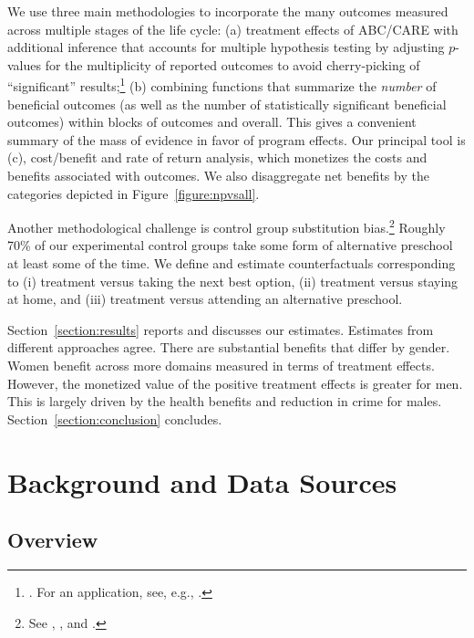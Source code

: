 We use three main methodologies to incorporate the many outcomes measured across multiple stages of the life cycle: (a) treatment effects of ABC/CARE with additional inference that accounts for multiple hypothesis testing by adjusting $p$-values for the multiplicity of reported outcomes to avoid cherry-picking of ``significant'' results;\footnote{\cite{Romano_Wolf_2005_JASA}. For an application, see, e.g., \cite{Heckman_Moon_etal_2010_QE}.} (b) combining functions that summarize the \emph{number} of beneficial outcomes (as well as the number of statistically significant beneficial outcomes) within blocks of outcomes and overall. This gives a convenient summary of the mass of evidence in favor of program effects. Our principal tool is (c), cost/benefit and rate of return analysis, which monetizes the costs and benefits associated with outcomes. We also disaggregate net benefits by the categories depicted in Figure~\ref{figure:npvsall}.

Another methodological challenge is control group substitution bias.\footnote{See \cite{Heckman_1992_randomization}, \cite{Heckman_Hohmann_etal_2000_QJE}, and \cite{Kline-Walters_2016_QJE}.} Roughly 70\% of our experimental control groups take some form of alternative preschool at least some of the time. We define and estimate counterfactuals corresponding to (i) treatment versus taking the next best option, (ii) treatment versus staying at home, and (iii) treatment versus attending an alternative preschool.

Section~\ref{section:results} reports and discusses our estimates. Estimates from different approaches agree. There are substantial benefits that differ by gender. Women benefit across more domains measured in terms of treatment effects. However, the monetized value of the positive treatment effects is greater for men. This is largely driven by the health benefits and reduction in crime for males. Section~\ref{section:conclusion} concludes.

\section[Background and Data Sources]{Background and Data Sources} \label{section:background}

\subsection{Overview}

